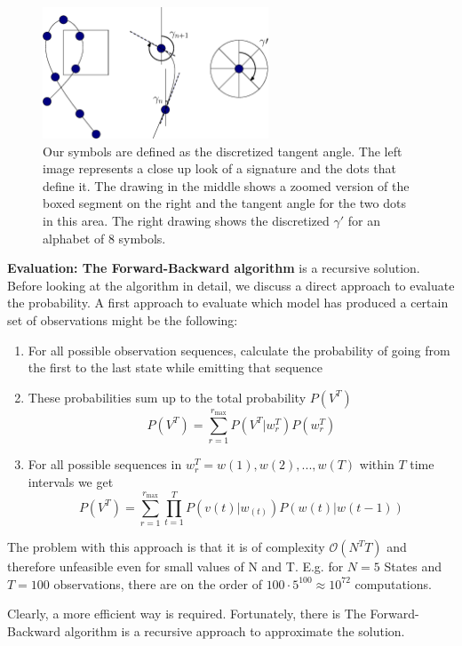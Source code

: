 \documentclass[a4paper, oneside]{csthesis}
\begin{document}
\begin{figure}[tb]
    \begin{center}
        \includegraphics[width=0.6\textwidth]{figures/symbol-creation.eps}
    \end{center}
    \caption{Our symbols are defined as the discretized tangent angle. The left image represents a close up look of a signature and the dots that define it. The drawing in the middle shows a zoomed version of the boxed segment on the right and the tangent angle for the two dots in this area. The right drawing shows the discretized $\gamma\prime$ for an alphabet of 8 symbols.}
    \label{fig:hmm-symbol-creation}
\end{figure}


\textbf{Evaluation: The Forward-Backward algorithm} is a recursive solution. Before looking at the algorithm in detail, we discuss a direct approach to evaluate the probability. A first approach to evaluate which model has produced a certain set of observations might be the following:
\begin{enumerate}
\item For all possible observation sequences, calculate the probability of going from the first to the last state while emitting that sequence
\item These probabilities sum up to the total probability $P(V^T)$
$$P(V^T) = \sum\limits_{r=1}^{r_\text{max}} P(V^T | w_r^T)P(w_r^T)$$
\item For all possible sequences in $w_r^T = w(1), w(2), ..., w(T)$ within $T$ time intervals we get
$$P(V^T) = \sum\limits_{r=1}^{r_\text{max}} \prod\limits_{t=1}^T  P(v(t) | w_(t)) P(w(t)|w(t-1))$$
\end{enumerate}
The problem with this approach is that it is of complexity $\mathcal{O}(N^TT)$ and therefore unfeasible even for small values of N and T. E.g. for $N=5$ States and $T=100$ observations, there are on the order of $100 \cdot 5^100 \approx 10^{72}$ computations.

Clearly, a more efficient way is required. Fortunately, there is The Forward-Backward algorithm is a recursive approach to approximate the solution.
\end{document}
